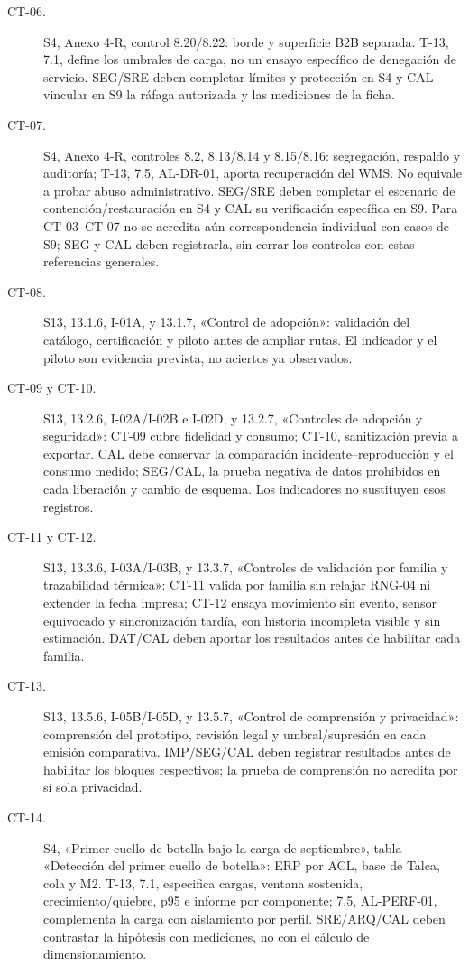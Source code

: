 \begin{description}
\item[CT-06.] S4, Anexo 4-R, control 8.20/8.22: borde y superficie B2B separada. T-13, 7.1, define los umbrales de carga, no un ensayo específico de denegación de servicio. SEG/SRE deben completar límites y protección en S4 y CAL vincular en S9 la ráfaga autorizada y las mediciones de la ficha.
\item[CT-07.] S4, Anexo 4-R, controles 8.2, 8.13/8.14 y 8.15/8.16: segregación, respaldo y auditoría; T-13, 7.5, AL-DR-01, aporta recuperación del WMS. No equivale a probar abuso administrativo. SEG/SRE deben completar el escenario de contención/restauración en S4 y CAL su verificación específica en S9. Para CT-03--CT-07 no se acredita aún correspondencia individual con casos de S9; SEG y CAL deben registrarla, sin cerrar los controles con estas referencias generales.
\item[CT-08.] S13, 13.1.6, I-01A, y 13.1.7, «Control de adopción»: validación del catálogo, certificación y piloto antes de ampliar rutas. El indicador y el piloto son evidencia prevista, no aciertos ya observados.
\item[CT-09 y CT-10.] S13, 13.2.6, I-02A/I-02B e I-02D, y 13.2.7, «Controles de adopción y seguridad»: CT-09 cubre fidelidad y consumo; CT-10, sanitización previa a exportar. CAL debe conservar la comparación incidente--reproducción y el consumo medido; SEG/CAL, la prueba negativa de datos prohibidos en cada liberación y cambio de esquema. Los indicadores no sustituyen esos registros.
\item[CT-11 y CT-12.] S13, 13.3.6, I-03A/I-03B, y 13.3.7, «Controles de validación por familia y trazabilidad térmica»: CT-11 valida por familia sin relajar RNG-04 ni extender la fecha impresa; CT-12 ensaya movimiento sin evento, sensor equivocado y sincronización tardía, con historia incompleta visible y sin estimación. DAT/CAL deben aportar los resultados antes de habilitar cada familia.
\item[CT-13.] S13, 13.5.6, I-05B/I-05D, y 13.5.7, «Control de comprensión y privacidad»: comprensión del prototipo, revisión legal y umbral/supresión en cada emisión comparativa. IMP/SEG/CAL deben registrar resultados antes de habilitar los bloques respectivos; la prueba de comprensión no acredita por sí sola privacidad.
\item[CT-14.] S4, «Primer cuello de botella bajo la carga de septiembre», tabla «Detección del primer cuello de botella»: ERP por ACL, base de Talca, cola y M2. T-13, 7.1, especifica cargas, ventana sostenida, crecimiento/quiebre, p95 e informe por componente; 7.5, AL-PERF-01, complementa la carga con aislamiento por perfil. SRE/ARQ/CAL deben contrastar la hipótesis con mediciones, no con el cálculo de dimensionamiento.

\end{description}
